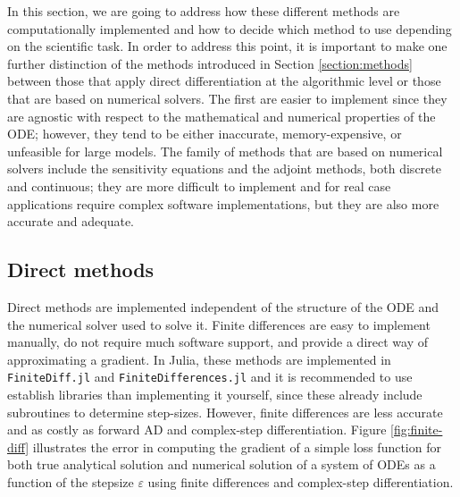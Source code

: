 
In this section, we are going to address how these different methods are computationally implemented and how to decide which method to use depending on the scientific task.
In order to address this point, it is important to make one further distinction of the methods introduced in Section \ref{section:methods} between those that apply direct differentiation at the algorithmic level or those that are based on numerical solvers.  
The first are easier to implement since they are agnostic with respect to the mathematical and numerical properties of the ODE; however, they tend to be either inaccurate, memory-expensive, or unfeasible for large models. 
The family of methods that are based on numerical solvers include the sensitivity equations and the adjoint methods, both discrete and continuous; they are more difficult to implement and for real case applications require complex software implementations, but they are also more accurate and adequate. 

\subsection{Direct methods}

Direct methods are implemented independent of the structure of the ODE and the numerical solver used to solve it. 
Finite differences are easy to implement manually, do not require much software support, and provide a direct way of approximating a gradient. 
In Julia, these methods are implemented in \texttt{FiniteDiff.jl} and \texttt{FiniteDifferences.jl} and it is recommended to use establish libraries than implementing it yourself, since these already include subroutines to determine step-sizes.
However, finite differences are less accurate and as costly as forward AD \cite{Griewack-on-AD} and complex-step differentiation. 
Figure \ref{fig:finite-diff} illustrates the error in computing the gradient of a simple loss function for both true analytical solution and numerical solution of a system of ODEs as a function of the stepsize $\varepsilon$ using finite differences and complex-step differentiation.

